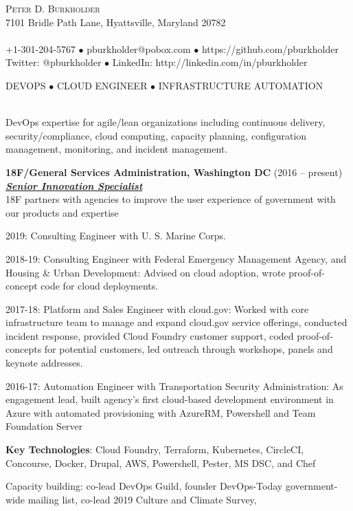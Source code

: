 \documentclass{article}
\newcommand{\lineunder}{\vspace*{-8pt} \\ \hspace*{-18pt} \hrulefill \\}
\newcommand{\header}[1]{{\hspace*{-15pt}\vspace*{6pt} \textsc{#1}} \vspace*{-6pt} \lineunder}
\newcommand{\centeredheader}[1]{
  \vspace*{6pt}
  \begin{center}
    \textsc{#1}
    \lineunder
  \end{center}
}
\newcommand{\employer}[3]{{ \textbf{#1} (#2)\\ \underline{\textbf{\emph{#3}}}\\ \nopagebreak }}
\newcommand{\contact}[3]{
    \vspace*{-8pt}
    \begin{center}
        {\LARGE \scshape {#1}}\\
        #2 \lineunder
        #3
    \end{center}
    \vspace*{-8pt}
}
\newenvironment{achievements}{\begin{list}{\topsep 0pt \itemsep -2pt}} {\vspace*{4pt}\end{list}}
\begin{document}
\smallskip
\vspace*{-44pt}

\contact{Peter D. Burkholder}
  {7101 Bridle Path Lane, Hyattsville, Maryland 20782}
  {+1-301-204-5767 $\bullet$ pburkholder@pobox.com  $\bullet$ https://github.com/pburkholder
    \linebreak Twitter: @pburkholder $\bullet$ LinkedIn: http://linkedin.com/in/pburkholder }

\centeredheader{DEVOPS $\bullet$ CLOUD ENGINEER $\bullet$ INFRASTRUCTURE AUTOMATION}
  DevOps expertise for agile/lean organizations including continuous delivery, 
  security/compliance, cloud computing, capacity planning, configuration management, 
  monitoring, and incident management.

\smallskip
\vspace*{16pt}

\employer{18F/General Services Administration, Washington DC}{2016 -- present}{Senior Innovation Specialist}
\smallskip
18F partners with agencies to improve the user experience of government with our products and expertise
\begin{achievements}
  \item 2019: Consulting Engineer with U. S. Marine Corps. 
  \item 2018-19: Consulting Engineer with Federal Emergency Management Agency, and Housing \&
    Urban Development: Advised on cloud adoption, wrote proof-of-concept code for cloud deployments.
  \item 2017-18: Platform and Sales Engineer with cloud.gov: Worked with core infrastructure team to manage and expand 
    cloud.gov service offerings, conducted incident response, provided Cloud Foundry customer support, coded proof-of-concepts for
    potential customers, led outreach through workshops, panels and keynote addresses.
  \item 2016-17: Automation Engineer with Transportation Security Administration: As engagement lead, 
  built agency's first cloud-based development environment in Azure with automated provisioning with 
  AzureRM, Powershell and Team Foundation Server
  \item \textbf{Key Technologies}: Cloud Foundry, Terraform, Kubernetes, 
    CircleCI, Concourse, Docker, Drupal, AWS, Powershell, Pester, MS DSC, and Chef
  \item Capacity building: co-lead DevOps Guild, founder DevOps-Today government-wide mailing list, 
    co-lead 2019 Culture and Climate Survey, 

  
\end{achievements}
\end{document}
